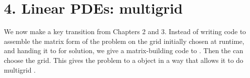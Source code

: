 
\chapter{4. Linear PDEs: multigrid}

We now make a key transition from Chapters 2 and 3.  Instead of writing code to assemble the matrix form of the problem on the grid initially chosen at runtime, and handing it to \pKSP for solution, we give a matrix-building code to \pKSP.  Then the \pKSP can choose the grid.  This gives the problem to a \PETSc \pKSP object in a way that allows it to do multigrid \citep{Briggsetal2000}.



